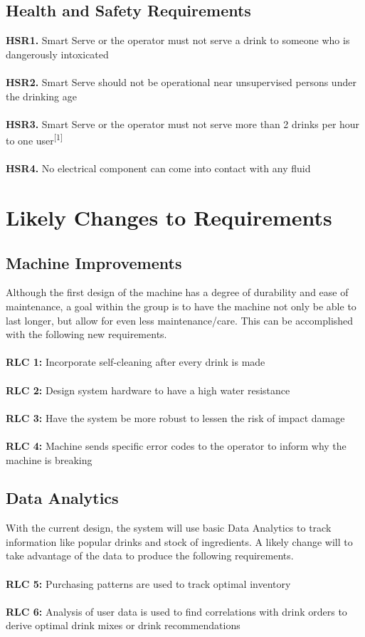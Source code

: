 \documentclass{article}
\begin{document}
\subsection{Health and Safety Requirements}
    \noindent\textbf{HSR1.} Smart Serve or the operator must not serve a drink to someone who is dangerously intoxicated \\\\
    \textbf{HSR2.} Smart Serve should not be operational near unsupervised persons under the drinking age \\\\
    \textbf{HSR3.} Smart Serve or the operator must not serve more than 2 drinks per hour to one user\textsuperscript{[1]} \\\\
    \textbf{HSR4.} No electrical component can come into contact with any fluid \\

\section{Likely Changes to Requirements}
\subsection{Machine Improvements}
    \noindent Although the first design of the machine has a degree of durability and ease of maintenance, a goal within the group is to have the machine not only be able to last longer, but allow for even less maintenance/care. This can be accomplished with the following new requirements. \\\\
    \textbf{RLC 1:} Incorporate self-cleaning after every drink is made\\\\
    \textbf{RLC 2:} Design system hardware to have a high water resistance\\\\
    \textbf{RLC 3:} Have the system be more robust to lessen the risk of impact damage\\\\
    \textbf{RLC 4:} Machine sends specific error codes to the operator to inform why the machine is breaking\\
\subsection{Data Analytics}
    \noindent With the current design, the system will use basic Data Analytics to track information like popular drinks and stock of ingredients. A likely change will to take advantage of the data to produce the following requirements. \\\\
    \textbf{RLC 5:} Purchasing patterns are used to track optimal inventory \\\\
    \textbf{RLC 6:} Analysis of user data is used to find correlations with drink orders to derive optimal drink mixes or drink recommendations\\
\end{document}
